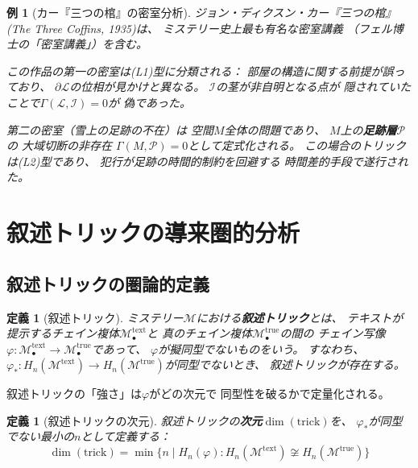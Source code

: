 \documentclass[12pt,twocolumn]{ltjsarticle}
\newtheorem{definition}[theorem]{定義}
\newtheorem{example}[theorem]{例}
\newcommand{\Mys}{\mathcal{M}}
\newcommand{\Lock}{\mathcal{L}}
\begin{document}
\begin{example}[カー『三つの棺』の密室分析]
\label{ex:three_coffins}
ジョン・ディクスン・カー『三つの棺』
(\textit{The Three Coffins}, 1935)は、
ミステリー史上最も有名な密室講義
（フェル博士の「密室講義」）を含む。

この作品の第一の密室は(L1)型に分類される：
部屋の構造に関する前提が誤っており、
$\partial \Lock$の位相が見かけと異なる。
$\mathcal{I}$の茎が非自明となる点が
隠されていたことで$\Gamma(\Lock, \mathcal{I}) = 0$が
偽であった。

第二の密室（雪上の足跡の不在）は
空間$M$全体の問題であり、
$M$上の\textbf{足跡層}$\mathcal{P}$の
大域切断の非存在
$\Gamma(M, \mathcal{P}) = 0$として定式化される。
この場合のトリックは(L2)型であり、
犯行が足跡の時間的制約を回避する
時間差的手段で遂行された。
\end{example}


\section{叙述トリックの導来圏的分析}
\label{sec:unreliable}

\subsection{叙述トリックの圏論的定義}

\begin{definition}[叙述トリック]
\label{def:narrative_trick}
ミステリー$\Mys$における\textbf{叙述トリック}とは、
テキストが提示するチェイン複体$\Mys^{\mathrm{text}}_\bullet$と
真のチェイン複体$\Mys^{\mathrm{true}}_\bullet$の間の
チェイン写像$\varphi: \Mys^{\mathrm{text}}_\bullet \to
\Mys^{\mathrm{true}}_\bullet$であって、
$\varphi$が擬同型\emph{でない}ものをいう。
すなわち、$\varphi_*: H_n(\Mys^{\mathrm{text}}) \to
H_n(\Mys^{\mathrm{true}})$が同型でないとき、
叙述トリックが存在する。
\end{definition}

叙述トリックの「強さ」は$\varphi$がどの次元で
同型性を破るかで定量化される。

\begin{definition}[叙述トリックの次元]
叙述トリックの\textbf{次元}$\dim(\text{trick})$を、
$\varphi_*$が同型でない最小の$n$として定義する：
\begin{equation}
\dim(\text{trick}) = \min\{n \mid
H_n(\varphi): H_n(\Mys^{\text{text}}) \not\cong H_n(\Mys^{\text{true}})\}
\end{equation}
\end{definition}
\end{document}
